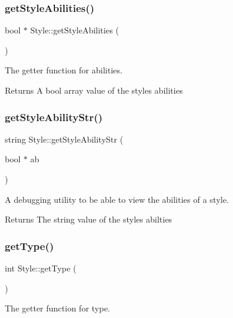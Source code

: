 \subsubsection{\texorpdfstring{getStyleAbilities()}{getStyleAbilities()}}
{\footnotesize\ttfamily bool $\ast$ Style\+::get\+Style\+Abilities (\begin{DoxyParamCaption}{ }\end{DoxyParamCaption})}



The getter function for abilities. 

\begin{DoxyReturn}{Returns}
A bool array value of the style\textquotesingle{}s abilities 
\end{DoxyReturn}
\mbox{\label{class_style_a00ba8b3874a8204c496cc73e4d60bcbc}} 
\subsubsection{\texorpdfstring{getStyleAbilityStr()}{getStyleAbilityStr()}}
{\footnotesize\ttfamily string Style\+::get\+Style\+Ability\+Str (\begin{DoxyParamCaption}\item[{bool $\ast$}]{ab }\end{DoxyParamCaption})}



A debugging utility to be able to view the abilities of a style. 

\begin{DoxyReturn}{Returns}
The string value of the style\textquotesingle{}s abilties 
\end{DoxyReturn}
\mbox{\label{class_style_a15e75f3291c7a3cacf317c6d0a170060}} 
\subsubsection{\texorpdfstring{getType()}{getType()}}
{\footnotesize\ttfamily int Style\+::get\+Type (\begin{DoxyParamCaption}{ }\end{DoxyParamCaption})}



The getter function for type. 

